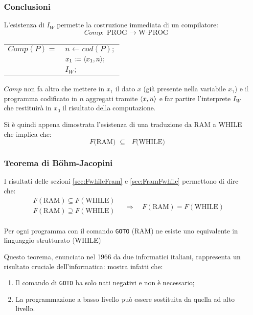 \subsubsection*{Conclusioni}
L'esistenza di $I_W$ permette la costruzione immediata di un compilatore:
$$ Comp:\text{PROG\ $\to$ W-PROG} $$

\renewcommand{\arraystretch}{1.25}
\begin{center}
\begin{tabular}{r|l|} \cline{2-2}
 $Comp(P)=$ & $n\leftarrow cod(P);$\\
            & $x_1 := \langle x_1,n\rangle;$\\
            & $I_W;$ \\ \cline{2-2}
\end{tabular}
\end{center}\vspace{.5cm}

$Comp$ non fa altro che mettere in $x_1$ il dato $x$ (già presente nella variabile $x_1$) e 
il programma codificato in $n$ aggregati tramite $\langle x,n\rangle$ e far partire l'interprete 
$I_W$ che restituirà in $x_0$ il risultato della computazione.

Si è quindi appena dimostrata l'esistenza di una traduzione da RAM a WHILE che implica che:
$$ \text{$F$(RAM) $\subseteq$ $F$(WHILE)} $$

\subsubsection{Teorema di Böhm-Jacopini}
I risultati delle sezioni \ref{sec:FwhileFram} e \ref{sec:FramFwhile} permettono di dire
che:
$$ \begin{matrix}
    F(\text{RAM})\subseteq F(\text{WHILE}) \\
    F(\text{RAM})\supseteq F(\text{WHILE}) \\
\end{matrix} \quad \Rightarrow \quad
 F(\text{RAM})=F(\text{WHILE}) $$

\begin{theorem}
    Per ogni programma con il comando \texttt{GOTO} (RAM) ne esiste uno equivalente in
    linguaggio strutturato (WHILE)
\end{theorem}

Questo teorema, enunciato nel 1966 da due informatici italiani, rappresenta un risultato
cruciale dell'informatica: mostra infatti che:
\begin{enumerate}
    \item Il comando di \texttt{GOTO} ha solo nati negativi e non è necessario;
    \item La programmazione a basso livello può essere sostituita da quella ad alto
        livello.
\end{enumerate}